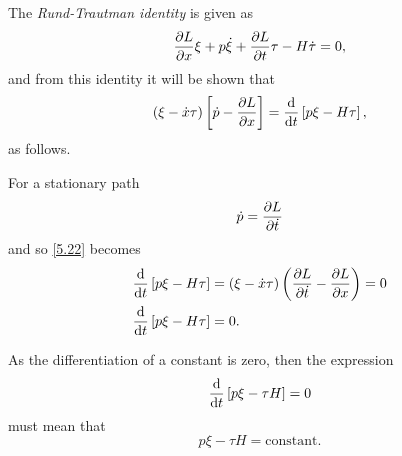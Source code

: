\begin{comment}
Firstly, for the purposes of part (d) (at least the first part of it), it's not the case that both sides are equal to 0. You have to prove that the identity holds for all paths, not just stationary paths. In other words, you cannot use that p-dot = dL/dx, until the very last bit of (d), when you do assume a stationary path. But the original identity must be proved without that. I'd recommend starting from the right hand side and (using the Rund-Trautman identity), show it equals the left.
\end{comment}
The \textit{Rund-Trautman identity} is given as
\begin{equation}
	\label{eq:5.3}
	\frac{\partial L}{\partial x}\xi +p\dot{\xi} +\frac{\partial L}{\partial t}\tau - H\dot{\tau}=0,
\end{equation}
and from this identity it will be shown that 
\begin{equation}
	\label{eq:5.4}
	\left(\xi-\dot{x}\tau\right)\left[\dot{p}-\frac{\partial L}{\partial x}\right] = \frac{\mathrm{d}}{\mathrm{d}t}\left[p\xi-H\tau\right],
\end{equation}
as follows.


For a stationary path 
\[
	\dot{p} = \frac{\partial L}{\partial \dot{t}}
\]
and so \eqref{5.22} becomes
\begin{align}
	\frac{\mathrm{d}}{\mathrm{d}t}\left[p\xi-H\tau\right]&=  \left(\xi- \dot{x}\tau\right)\left(\frac{\partial L}{\partial \dot{t}} -\frac{\partial L}{\partial x}\right) = 0\\
	\frac{\mathrm{d}}{\mathrm{d}t}\left[p\xi-H\tau\right]&= 0.
\end{align}

As the differentiation of a constant is zero, then the expression 
\[
	\frac{\mathrm{d}}{\mathrm{d}t}\left[p\xi - \tau H\right] = 0
\]
must mean that 
\[
	p\xi - \tau H = \text{constant}.
\]